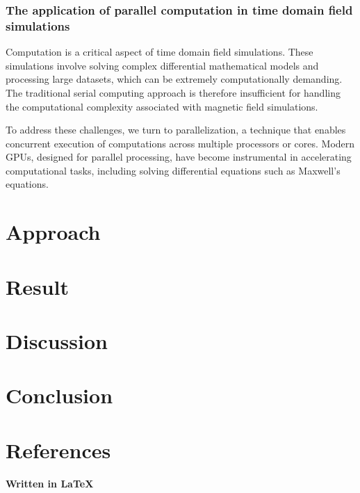 \documentclass[11pt, a4paper, titlepage]{article}
\begin{document}
\subsubsection{The application of parallel computation in time domain field simulations}
Computation is a critical aspect of time domain field simulations. These simulations involve solving complex differential mathematical models and processing large datasets, which can be extremely computationally demanding. The traditional serial computing approach is therefore insufficient for handling the computational complexity associated with magnetic field simulations.

To address these challenges, we turn to parallelization, a technique that enables concurrent execution of computations across multiple processors or cores. Modern GPUs, designed for parallel processing, have become instrumental in accelerating computational tasks, including solving differential equations such as Maxwell's equations.




\newpage
\section{Approach}
\newpage
\section{Result}
\newpage
\section{Discussion}
\newpage
\section{Conclusion}
\newpage
\section{References}

\newpage
\newpage
{} 
\printbibliography




\begin{center}
	\large\textbf{Written in \LaTeX}
\end{center}
\end{document}
